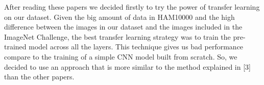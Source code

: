 	\smallskip
	
	After reading these papers we decided firstly to try the power of transfer learning on our dataset. Given the big amount of data in HAM10000 and the high difference between the images in our dataset and the images included in the ImageNet Challenge, the best transfer learning strategy was to train the pre-trained model across all the layers. This technique gives us bad performance compare to the training of a simple CNN model built from scratch. So, we decided to use an approach that is more similar to the method explained in [3] than the other papers.
	